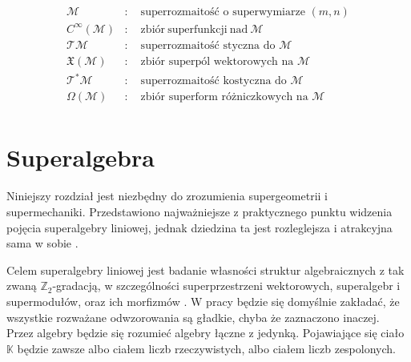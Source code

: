 \documentclass[11pt,a4paper]{report}
\theoremstyle{definition}
\begin{document}
\begin{equation*}
\begin{aligned}
		\mathcal{M}                                    & : \quad \textrm{superrozmaitość o superwymiarze } (m,n)                                                                                                      \\
		C^\infty(\mathcal{M})                          & : \quad \mathrm{zbiór\ superfunkcji\ nad\ } \mathcal M                                                                                                        \\
		\mathcal{TM}                                   & : \quad \textrm{superrozmaitość styczna do }\mathcal{M}                                                                                                      \\
		\mathfrak X(\mathcal M)                        & : \quad \textrm{zbiór superpól wektorowych na }\mathcal{M}                                                                                                   \\
		\mathcal{T^*M}                                 & : \quad \textrm{superrozmaitość kostyczna do }\mathcal{M}                                                                                                    \\
		\Omega(\mathcal{M})                            & : \quad \textrm{zbiór superform różniczkowych na }\mathcal{M}                                                                                               \\
	\end{aligned}
\end{equation*}

\chapter{Superalgebra}

Niniejszy rozdział jest niezbędny do zrozumienia supergeometrii i supermechaniki. Przedstawiono najważniejsze z praktycznego punktu widzenia pojęcia superalgebry liniowej, jednak dziedzina ta jest rozleglejsza i atrakcyjna sama w sobie \cite{Co12,Du08,KT99,LZ17,Sa08,Tr99}.

Celem superalgebry liniowej jest badanie własności struktur algebraicznych z tak zwaną $\mathbb{Z}_2$-gradacją, w szczególności superprzestrzeni wektorowych, superalgebr i supermodułów, oraz ich morfizmów \cite{leites,rogers}.
W pracy będzie się domyślnie zakładać, że wszystkie rozważane odwzorowania są gładkie, chyba że zaznaczono inaczej. Przez algebry będzie się rozumieć algebry łączne z jedynką. Pojawiające się ciało $\mathbb{K}$ będzie zawsze albo ciałem liczb rzeczywistych, albo ciałem liczb zespolonych.
\end{document}
